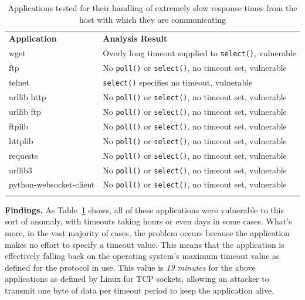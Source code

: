 \begin{table}[t]
  \scriptsize{}
  \begin{tabular}{l | l}
    \toprule{}
	  {\bf Application}              & {\bf Analysis Result}\\
    wget                     & Overly long timeout supplied to {\tt select()}, vulnerable\\
    ftp                      & No {\tt poll()} or {\tt select()}, no timeout set, vulnerable\\
    telnet                   & {\tt select()} specifies no timeout, vulnerable\\
    urllib http              & No {\tt poll()} or {\tt select()}, no timeout set, vulnerable\\
    urllib ftp               & No {\tt poll()} or {\tt select()}, no timeout set, vulnerable\\
    ftplib                   & No {\tt poll()} or {\tt select()}, no timeout set, vulnerable\\
    httplib                  & No {\tt poll()} or {\tt select()}, no timeout set, vulnerable\\
    requests                 & No {\tt poll()} or {\tt select()}, no timeout set, vulnerable\\
    urllib3                  & No {\tt poll()} or {\tt select()}, no timeout set, vulnerable\\
    python-websocket-client  & No {\tt poll()} or {\tt select()}, no timeout set, vulnerable\\
    \bottomrule{}
  \end{tabular}
  \caption{Applications tested for their handling of extremely slow response
    times from the host with which they are communicating }
  \label{table:slowloris}
\end{table}


{\bf Findings.}
 As Table~\ref{table:slowloris} shows, all of these
 applications %
 were vulnerable to this sort of anomaly, with timeouts taking hours or
even days in some cases.
What's more, in the vast
majority of cases, the problem occurs because the application makes no effort to specify a
timeout value.  This means that the application is effectively falling back on
the operating system's maximum timeout value as defined for the protocol in
use.  This value is \emph{19 minutes} for the above applications as defined by
Linux for TCP sockets, allowing an
attacker to transmit one byte of data per timeout period to keep the
application alive.

